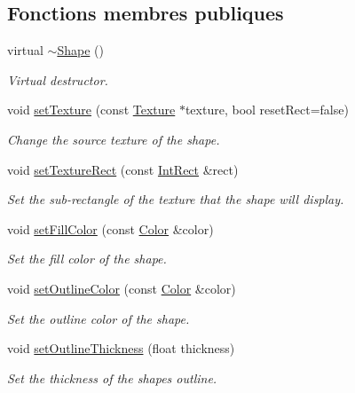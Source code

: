 \subsection*{Fonctions membres publiques}
\begin{DoxyCompactItemize}
\item 
\mbox{\label{classsf_1_1Shape_a2262aceb9df52d4275c19633592f19bf}} 
virtual \hyperlink{classsf_1_1Shape_a2262aceb9df52d4275c19633592f19bf}{$\sim$\+Shape} ()
\begin{DoxyCompactList}\small\item\em Virtual destructor. \end{DoxyCompactList}\item 
void \hyperlink{classsf_1_1Shape_af8fb22bab1956325be5d62282711e3b6}{set\+Texture} (const \hyperlink{classsf_1_1Texture}{Texture} $\ast$texture, bool reset\+Rect=false)
\begin{DoxyCompactList}\small\item\em Change the source texture of the shape. \end{DoxyCompactList}\item 
void \hyperlink{classsf_1_1Shape_a2029cc820d1740d14ac794b82525e157}{set\+Texture\+Rect} (const \hyperlink{classsf_1_1Rect}{Int\+Rect} \&rect)
\begin{DoxyCompactList}\small\item\em Set the sub-\/rectangle of the texture that the shape will display. \end{DoxyCompactList}\item 
void \hyperlink{classsf_1_1Shape_a3506f9b5d916fec14d583d16f23c2485}{set\+Fill\+Color} (const \hyperlink{classsf_1_1Color}{Color} \&color)
\begin{DoxyCompactList}\small\item\em Set the fill color of the shape. \end{DoxyCompactList}\item 
void \hyperlink{classsf_1_1Shape_a5978f41ee349ac3c52942996dcb184f7}{set\+Outline\+Color} (const \hyperlink{classsf_1_1Color}{Color} \&color)
\begin{DoxyCompactList}\small\item\em Set the outline color of the shape. \end{DoxyCompactList}\item 
void \hyperlink{classsf_1_1Shape_a5ad336ad74fc1f567fce3b7e44cf87dc}{set\+Outline\+Thickness} (float thickness)
\begin{DoxyCompactList}\small\item\em Set the thickness of the shape\textquotesingle{}s outline. \end{DoxyCompactList}\item 

\end{DoxyCompactItemize}
